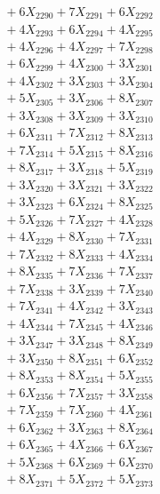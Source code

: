 \documentclass[a4paper,10pt]{article}
\begin{document}
{\begin{align}
&\;  + 6 X_{2290} + 7 X_{2291} + 6 X_{2292} \\[0.3ex]
&\;  + 4 X_{2293} + 6 X_{2294} + 4 X_{2295} \\[0.3ex]
&\;  + 4 X_{2296} + 4 X_{2297} + 7 X_{2298} \\[0.3ex]
&\;  + 6 X_{2299} + 4 X_{2300} + 3 X_{2301} \\[0.3ex]
&\;  + 4 X_{2302} + 3 X_{2303} + 3 X_{2304} \\[0.3ex]
&\;  + 5 X_{2305} + 3 X_{2306} + 8 X_{2307} \\[0.3ex]
&\;  + 3 X_{2308} + 3 X_{2309} + 3 X_{2310} \\[0.3ex]
&\;  + 6 X_{2311} + 7 X_{2312} + 8 X_{2313} \\[0.3ex]
&\;  + 7 X_{2314} + 5 X_{2315} + 8 X_{2316} \\[0.3ex]
&\;  + 8 X_{2317} + 3 X_{2318} + 5 X_{2319} \\[0.5ex]\allowbreak
&\;  + 3 X_{2320} + 3 X_{2321} + 3 X_{2322} \\[0.3ex]
&\;  + 3 X_{2323} + 6 X_{2324} + 8 X_{2325} \\[0.3ex]
&\;  + 5 X_{2326} + 7 X_{2327} + 4 X_{2328} \\[0.3ex]
&\;  + 4 X_{2329} + 8 X_{2330} + 7 X_{2331} \\[0.3ex]
&\;  + 7 X_{2332} + 8 X_{2333} + 4 X_{2334} \\[0.3ex]
&\;  + 8 X_{2335} + 7 X_{2336} + 7 X_{2337} \\[0.3ex]
&\;  + 7 X_{2338} + 3 X_{2339} + 7 X_{2340} \\[0.3ex]
&\;  + 7 X_{2341} + 4 X_{2342} + 3 X_{2343} \\[0.3ex]
&\;  + 4 X_{2344} + 7 X_{2345} + 4 X_{2346} \\[0.3ex]
&\;  + 3 X_{2347} + 3 X_{2348} + 8 X_{2349} \\[0.5ex]\allowbreak
&\;  + 3 X_{2350} + 8 X_{2351} + 6 X_{2352} \\[0.3ex]
&\;  + 8 X_{2353} + 8 X_{2354} + 5 X_{2355} \\[0.3ex]
&\;  + 6 X_{2356} + 7 X_{2357} + 3 X_{2358} \\[0.3ex]
&\;  + 7 X_{2359} + 7 X_{2360} + 4 X_{2361} \\[0.3ex]
&\;  + 6 X_{2362} + 3 X_{2363} + 8 X_{2364} \\[0.3ex]
&\;  + 6 X_{2365} + 4 X_{2366} + 6 X_{2367} \\[0.3ex]
&\;  + 5 X_{2368} + 6 X_{2369} + 6 X_{2370} \\[0.3ex]
&\;  + 8 X_{2371} + 5 X_{2372} + 5 X_{2373} \\[0.3ex]

\end{align}}
\end{document}
